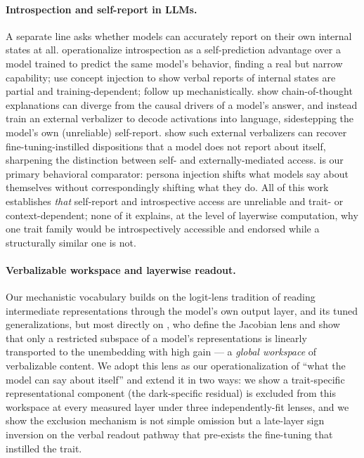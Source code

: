 \paragraph{Introspection and self-report in LLMs.}
A separate line asks whether models can accurately report on their own internal states at all. \citet{binder2024introspection} operationalize introspection as a self-prediction advantage over a model trained to predict the same model's behavior, finding a real but narrow capability; \citet{lindsey2026introspective} use concept injection to show verbal reports of internal states are partial and training-dependent; \citet{macar2026mechanisms} follow up mechanistically. \citet{turpin2023saywhatthink} show chain-of-thought explanations can diverge from the causal drivers of a model's answer, and \citet{pan2024latentqa} instead train an external verbalizer to decode activations into language, sidestepping the model's own (unreliable) self-report. \citet{karvonen2025oracles} show such external verbalizers can recover fine-tuning-instilled dispositions that a model does not report about itself, sharpening the distinction between self- and externally-mediated access. \citet{han2025illusion} is our primary behavioral comparator: persona injection shifts what models say about themselves without correspondingly shifting what they do. All of this work establishes \emph{that} self-report and introspective access are unreliable and trait- or context-dependent; none of it explains, at the level of layerwise computation, why one trait family would be introspectively accessible and endorsed while a structurally similar one is not.

\paragraph{Verbalizable workspace and layerwise readout.}
Our mechanistic vocabulary builds on the logit-lens tradition of reading intermediate representations through the model's own output layer, and its tuned generalizations, but most directly on \citet{gurnee2026workspace}, who define the Jacobian lens and show that only a restricted subspace of a model's representations is linearly transported to the unembedding with high gain — a \emph{global workspace} of verbalizable content. We adopt this lens as our operationalization of ``what the model can say about itself'' and extend it in two ways: we show a trait-specific representational component (the dark-specific residual) is excluded from this workspace at every measured layer under three independently-fit lenses, and we show the exclusion mechanism is not simple omission but a late-layer sign inversion on the verbal readout pathway that pre-exists the fine-tuning that instilled the trait.

